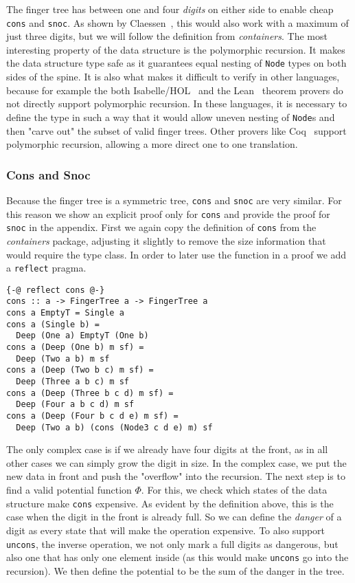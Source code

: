 \documentclass[sigplan,screen,review,anonymous]{acmart}
\begin{document}
The finger tree has between one and four \textit{digits} on either side to enable cheap \texttt{cons} and \texttt{snoc}. As shown by Claessen~\cite{fingertrees_new}, this would also work with a maximum of just three digits, but we will follow the definition from \textit{containers}. The most interesting property of the data structure is the polymorphic recursion. It makes the data structure type safe as it guarantees equal nesting of \texttt{Node} types on both sides of the spine. It is also what makes it difficult to verify in other languages, because for example the both Isabelle/HOL~\cite{isabelle} and the Lean~\cite{lean} theorem provers do not directly support polymorphic recursion. In these languages, it is necessary to define the type in such a way that it would allow uneven nesting of \texttt{Node}s and then "carve out" the subset of valid finger trees. Other provers like Coq~\cite{coq} support polymorphic recursion, allowing a more direct one to one translation.

\subsubsection{Cons and Snoc}

Because the finger tree is a symmetric tree, \texttt{cons} and \texttt{snoc} are very similar. For this reason we show an explicit proof only for \texttt{cons} and provide the proof for \texttt{snoc} in the appendix. First we again copy the definition of \texttt{cons} from the \textit{containers} package, adjusting it slightly to remove the size information that would require the type class. In order to later use the function in a proof we add a \texttt{reflect} pragma.

\begin{lstlisting}
{-@ reflect cons @-}
cons :: a -> FingerTree a -> FingerTree a
cons a EmptyT = Single a
cons a (Single b) =
  Deep (One a) EmptyT (One b)
cons a (Deep (One b) m sf) =
  Deep (Two a b) m sf
cons a (Deep (Two b c) m sf) =
  Deep (Three a b c) m sf
cons a (Deep (Three b c d) m sf) =
  Deep (Four a b c d) m sf
cons a (Deep (Four b c d e) m sf) =
  Deep (Two a b) (cons (Node3 c d e) m) sf
\end{lstlisting}

The only complex case is if we already have four digits at the front, as in all other cases we can simply grow the digit in size. In the complex case, we put the new data in front and push the "overflow" into the recursion. The next step is to find a valid potential function $\Phi$. For this, we check which states of the data structure make \texttt{cons} expensive. As evident by the definition above, this is the case when the digit in the front is already full. So we can define the \textit{danger} of a digit as every state that will make the operation expensive. To also support \texttt{uncons}, the inverse operation, we not only mark a full digits as dangerous, but also one that has only one element inside (as this would make \texttt{uncons} go into the recursion). We then define the potential to be the sum of the danger in the tree.
\end{document}

